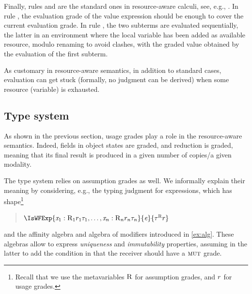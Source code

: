 Finally, rules  and  are the standard ones in resource-aware calculi, see, e.g., \cite{BianchiniDGZ23oopsla}. In rule , the evaluation grade of the value expression should be enough to cover the current evaluation grade.
In rule , the two subterms are evaluated sequentially, the latter in an environment where the local variable has been added  as available resource, modulo renaming to avoid clashes, with the graded value obtained by the evaluation of the first subterm.
  
As customary in resource-aware semantics, in addition to standard cases, evaluation can get stuck (formally, no judgment can be derived) when some resource (variable) is exhausted. 

\subsection{Type system}\label{sect:typesystem}
As shown in the previous section, usage grades play a role in the resource-aware semantics. Indeed, fields in object states are graded, and reduction is graded, meaning that its final result is produced in a given number of copies/a given modality.

The type system relies on assumption grades as well. We informally explain their meaning by considering, e.g., the typing judgment for expressions, which has shape\footnote{Recall that we use the metavariables $\textsc{R}$ for assumption grades, and $r$ for usage grades.}
\begin{quote}
$\IsWFExp{\CtxElem{\x_1}{\Rgr_1}{\rgr_1}{\tau_1}, \ldots, \CtxElem{\x_n}{\Rgr_n}{\rgr_n}{\tau_n}}{\e}{\Graded{\tau}{\Rgr}{\rgr}}$
\end{quote}
and  the affinity algebra and algebra of modifiers introduced in \cref{ex:alg}. These algebras allow to express \emph{uniqueness} and \emph{immutability} properties, assuming in the latter to add the condition in  that the receiver should have a $\textsc{mut}$ grade. 


